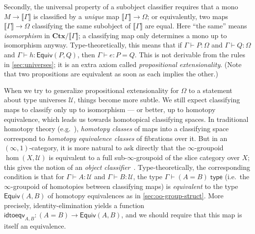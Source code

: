 \documentclass[12pt]{article}
\def\oo{\ensuremath{\infty}}
\def\ty{\;\mathsf{type}}
\def\m#1{\llbracket#1\rrbracket}
\def\types{\vdash}
\def\U{\mathscr{U}}
\def\equiv{\mathsf{Equiv}}
\def\Ctx{\mathbf{Ctx}}
\numberwithin{equation}{section}
\begin{document}
Secondly, the universal property of a subobject classifier requires that a mono $M \to \m\Gamma$ is classified by a \emph{unique} map $\m\Gamma\to\Omega$; or equivalently, two maps $\m\Gamma\to\Omega$ classifying the same subobject of $\m\Gamma$ are equal.
Here ``the same'' means \emph{isomorphism} in $\Ctx/\m\Gamma$; a classifying map only determines a mono up to isomorphism anyway.
Type-theoretically, this means that if $\Gamma\types P:\Omega$ and $\Gamma\types Q:\Omega$ and $\Gamma\types h:\equiv(P,Q)$, then $\Gamma\types e:P=Q$.
This is not derivable from the rules in \cref{sec:universes}; it is an extra axiom called \emph{propositional extensionality}.
(Note that two propositions are equivalent as soon as each implies the other.)

When we try to generalize propositional extensionality for $\Omega$ to a statement about type universes $\U$, things become more subtle.
We still expect classifying maps to classify only up to isomorphism --- or better, up to homotopy equivalence, which leads us towards homotopical classifying spaces.
In traditional homotopy theory (e.g.~\cite{may:csf}), \emph{homotopy classes} of maps into a classifying space correspond to \emph{homotopy equivalence classes} of fibrations over it.
But in an $(\oo,1)$-category, it is more natural to ask directly that the \oo-groupoid $\hom(X,\U)$ is equivalent to a full sub-\oo-groupoid of the slice category over $X$; this gives the notion of an \emph{object classifier}~\cite[\S6.1.6]{lurie:higher-topoi}.
Type-theoretically, the corresponding condition is that for $\Gamma\types A:\U$ and $\Gamma\types B:\U$, the type $\Gamma \types (A=B) \ty$ (i.e.\ the \oo-groupoid of homotopies between classifying maps) is \emph{equivalent} to the type $\equiv(A,B)$ of homotopy equivalences as in \cref{sec:oo-group-struct}.
More precisely, identity-elimination yields a function $\mathsf{idtoeqv}_{A,B} : (A=B) \to \equiv(A,B)$, and we should require that this map is itself an equivalence.
\end{document}

